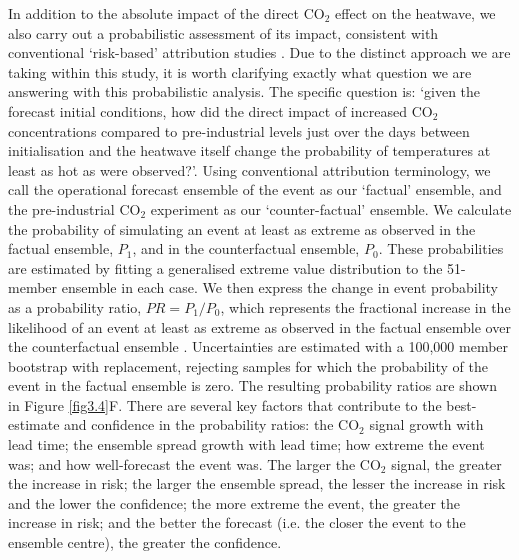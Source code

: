   In addition to the absolute impact of the direct CO$_2$ effect on the heatwave, we also carry out a probabilistic assessment of its impact, consistent with conventional `risk-based' attribution studies \citep{shepherd_common_2016,winsberg_severe_2020}. Due to the distinct approach we are taking within this study, it is worth clarifying exactly what question we are answering with this probabilistic analysis. The specific question is: `given the forecast initial conditions, how did the direct impact of increased CO$_2$ concentrations compared to pre-industrial levels just over the days between initialisation and the heatwave itself change the probability of temperatures at least as hot as were observed?'. Using conventional attribution terminology, we call the operational forecast ensemble of the event as our `factual' ensemble, and the pre-industrial CO$_2$ experiment as our `counter-factual' ensemble. We calculate the probability of simulating an event at least as extreme as observed in the factual ensemble, $P_1$, and in the counterfactual ensemble, $P_0$. These probabilities are estimated by fitting a generalised extreme value distribution to the 51-member ensemble in each case. We then express the change in event probability as a probability ratio, $PR=P_1/P_0$, which represents the fractional increase in the likelihood of an event at least as extreme as observed in the factual ensemble over the counterfactual ensemble \citep{stott_human_2004,stone_end--end_2005}. Uncertainties are estimated with a 100,000 member bootstrap with replacement, rejecting samples for which the probability of the event in the factual ensemble is zero. The resulting probability ratios are shown in Figure \ref{fig3.4}F. There are several key factors that contribute to the best-estimate and confidence in the probability ratios: the CO$_2$ signal growth with lead time; the ensemble spread growth with lead time; how extreme the event was; and how well-forecast the event was. The larger the CO$_2$ signal, the greater the increase in risk; the larger the ensemble spread, the lesser the increase in risk and the lower the confidence; the more extreme the event, the greater the increase in risk; and the better the forecast (i.e. the closer the event to the ensemble centre), the greater the confidence. 
  
